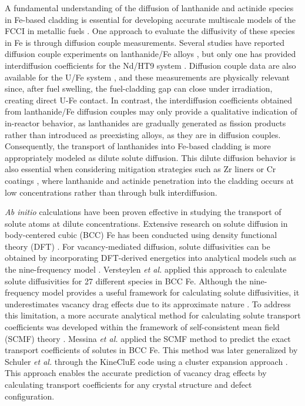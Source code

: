 \documentclass[preprint,12pt]{elsarticle}
\begin{document}
A fundamental understanding of the diffusion of lanthanide and actinide species in Fe-based cladding is essential for developing accurate multiscale models of the FCCI in metallic fuels \cite{aagesen_jr_physics-based_2022, aagesen_mechanistic_2023}. One approach to evaluate the diffusivity of these species in Fe is through diffusion couple measurements. Several studies have reported diffusion couple experiments on lanthanide/Fe alloys \cite{INAGAKI2013574, JERRED2020152387, helmreich_diffusion_2014}, but only one has provided interdiffusion coefficients for the Nd/HT9 system \cite{helmreich_diffusion_2014}. Diffusion couple data are also available for the U/Fe system \cite{huang2012interdiffusion, chen2015intermetallic}, and these measurements are physically relevant since, after fuel swelling, the fuel-cladding gap can close under irradiation, creating direct U-Fe contact. In contrast, the interdiffusion coefficients obtained from lanthanide/Fe diffusion couples may only provide a qualitative indication of in-reactor behavior, as lanthanides are gradually generated as fission products rather than introduced as preexisting alloys, as they are in diffusion couples. Consequently, the transport of lanthanides into Fe-based cladding is more appropriately modeled as dilute solute diffusion. This dilute diffusion behavior is also essential when considering mitigation strategies such as Zr liners or Cr coatings \cite{ryu_performance_2009, kim_performance_2009, jee_improvement_2013, OH2024113102}, where lanthanide and actinide penetration into the cladding occurs at low concentrations rather than through bulk interdiffusion.


\textit{Ab initio} calculations have been proven effective in studying the transport of solute atoms at dilute concentrations. Extensive research on solute diffusion in body-centered cubic (BCC) Fe has been conducted using density functional theory (DFT) \cite{messina_exact_2014, murali_bcc_fe_2015, versteylen_first-principles_2017}. For vacancy-mediated diffusion, solute diffusivities can be obtained by incorporating DFT-derived energetics into analytical models such as the nine-frequency model \cite{leclaire1970}. Versteylen \textit{et al.} \cite{versteylen_first-principles_2017} applied this approach to calculate solute diffusivities for 27 different species in BCC Fe. Although the nine-frequency model provides a useful framework for calculating solute diffusivities, it underestimates vacancy drag effects due to its approximate nature \cite{messina_exact_2014}. To address this limitation, a more accurate analytical method for calculating solute transport coefficients was developed within the framework of self-consistent mean field (SCMF) theory \cite{nastar_self-consistent_2000, nastar_mean_2005}. Messina \textit{et al.} \cite{messina_exact_2014} applied the SCMF method to predict the exact transport coefficients of solutes in BCC Fe. This method was later generalized by Schuler  \textit{et al.} through the KineCluE code \cite{schuler_kineclue_2020} using a cluster expansion approach \cite{schuler_transport_2016}. This approach enables the accurate prediction of vacancy drag effects by calculating transport coefficients for any crystal structure and defect configuration.
\end{document}
